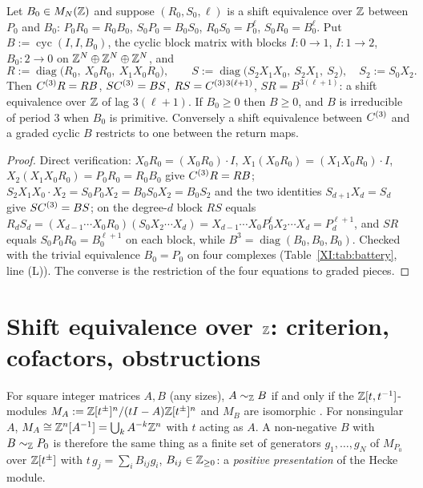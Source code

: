 \begin{lemma}\label{XI:lem:lift}
Let $B_0\in M_N(\mathbb{Z})$ and suppose $(R_0,S_0,\ell)$ is a shift equivalence over $\mathbb{Z}$ between
$P_0$ and $B_0$: $P_0R_0=R_0B_0$, $S_0P_0=B_0S_0$, $R_0S_0=P_0^{\ell}$, $S_0R_0=B_0^{\ell}$.
Put $B:=\operatorname{cyc}(I,I,B_0)$, the cyclic block matrix with blocks $I\colon0\to1$,
$I\colon1\to2$, $B_0\colon2\to0$ on $\mathbb{Z}^{N}\oplus\mathbb{Z}^{N}\oplus\mathbb{Z}^{N}$, and
\[
R:=\operatorname{diag}\bigl(R_0,\ X_0R_0,\ X_1X_0R_0\bigr),\qquad
S:=\operatorname{diag}\bigl(S_2X_1X_0,\ S_2X_1,\ S_2\bigr),\quad S_2:=S_0X_2 .
\]
Then $C^{(3)} R=RB$, $SC^{(3)}=BS$, $RS=C^{(3)}{}^{3(\ell+1)}$, $SR=B^{3(\ell+1)}$: a shift
equivalence over $\mathbb{Z}$ of lag $3(\ell+1)$. If $B_0\ge0$ then $B\ge0$, and $B$ is irreducible
of period $3$ when $B_0$ is primitive. Conversely a shift equivalence between $C^{(3)}$ and
a graded cyclic $B$ restricts to one between the return maps.
\end{lemma}

\begin{proof}
Direct verification: $X_0R_0=(X_0R_0)\cdot I$, $X_1(X_0R_0)=(X_1X_0R_0)\cdot I$,
$X_2(X_1X_0R_0)=P_0R_0=R_0B_0$ give $C^{(3)} R=RB$; $S_2X_1X_0\cdot X_2=S_0P_0X_2=B_0S_0X_2=
B_0S_2$ and the two identities $S_{d+1}X_d=S_d$ give $SC^{(3)}=BS$; on the degree-$d$ block
$RS$ equals $R_dS_d=(X_{d-1}\cdots X_0R_0)(S_0X_2\cdots X_d)=X_{d-1}\cdots X_0P_0^{\ell}X_2
\cdots X_d=P_d^{\ell+1}$, and $SR$ equals $S_0P_0R_0=B_0^{\ell+1}$ on each block, while
$B^{3}=\operatorname{diag}(B_0,B_0,B_0)$. Checked with the trivial equivalence
$B_0=P_0$ on four complexes (Table~\ref{XI:tab:battery}, line (L)). The converse is the
restriction of the four equations to graded pieces.
\end{proof}

\section{Shift equivalence over \texorpdfstring{$\mathbb{Z}$}{Z}: criterion, cofactors, obstructions}\label{XI:sec:se}

\begin{proposition}\label{XI:prop:module}
For square integer matrices $A,B$ (any sizes), $A\sim_{\mathbb{Z}} B$ if and only if the $\mathbb{Z}[t,t^{-1}]$-modules
$M_A:=\mathbb{Z}[t^{\pm}]^{n}/(tI-A)\mathbb{Z}[t^{\pm}]^{n}$ and $M_B$ are isomorphic \cite[\S2]{BS}. For
nonsingular $A$, $M_A\cong\mathbb{Z}^{n}[A^{-1}]=\bigcup_kA^{-k}\mathbb{Z}^{n}$ with $t$ acting as $A$. A
non-negative $B$ with $B\sim_{\mathbb{Z}} P_0$ is therefore the same thing as a finite set of generators
$g_1,\dots,g_N$ of $M_{P_0}$ over $\mathbb{Z}[t^{\pm}]$ with $t\,g_j=\sum_iB_{ij}g_i$, $B_{ij}\in
\mathbb{Z}_{\ge0}$: a \emph{positive presentation} of the Hecke module.
\end{proposition}

